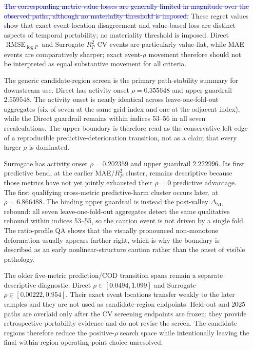 \documentclass[10pt]{article}
\theoremstyle{definition}
\newcommand{\1}{\mathbf{1}}
\newcommand{\oldtext}[1]{\textcolor{blue}{\sout{#1}}}
\newcommand{\latesttext}[1]{\textcolor{latestPurple}{#1}}
\newenvironment{oldrevisionblock}{%
  \begingroup
  \begin{tcolorbox}[
    enhanced,breakable,
    colback=white,colframe=white,boxrule=0pt,
    left=0pt,right=0pt,top=1pt,bottom=1pt,
    coltext=blue,
    overlay unbroken={\draw[blue,line width=.45pt] (frame.south west)--(frame.north east);\draw[blue,line width=.45pt] (frame.north west)--(frame.south east);},
    overlay first={\draw[blue,line width=.45pt] (frame.south west)--(frame.north east);},
    overlay middle={\draw[blue,line width=.45pt] (frame.south west)--(frame.north east);},
    overlay last={\draw[blue,line width=.45pt] (frame.north west)--(frame.south east);}
  ]
}{\end{tcolorbox}\endgroup}
\begin{document}
\begin{oldrevisionblock}
\oldtext{The corresponding metric-value losses are generally limited in magnitude over the observed paths, although no materiality threshold is imposed.}
\latesttext{These regret values show that exact event-location disagreement and value-based loss are distinct aspects of temporal portability; no materiality threshold is imposed. Direct $\operatorname{RMSE}_{\log P}$ and Surrogate $R^2_P$ CV events are particularly value-flat, while MAE events are comparatively sharper; exact event-$\rho$ movement therefore should not be interpreted as equal substantive movement for all criteria.}
\end{oldrevisionblock}

{\color{latestPurple}
The generic candidate-region screen is the primary path-stability summary for downstream use. Direct has activity onset $\rho=0.355648$ and upper guardrail $2.559548$. The activity onset is nearly identical across leave-one-fold-out aggregates (six of seven at the same grid index and one at the adjacent index), while the Direct guardrail remains within indices 53--56 in all seven recalculations. The upper boundary is therefore read as the conservative left edge of a reproducible predictive-deterioration transition, not as a claim that every larger $\rho$ is dominated.

Surrogate has activity onset $\rho=0.202359$ and upper guardrail $2.222996$. Its first predictive bend, at the earlier MAE/$R^2_P$ cluster, remains descriptive because those metrics have not yet jointly exhausted their $\rho=0$ predictive advantage. The first qualifying cross-metric predictive-harm cluster occurs later, at $\rho=6.866488$. The binding upper guardrail is instead the post-valley $\Delta_{\mathrm{NL}}$ rebound: all seven leave-one-fold-out aggregates detect the same qualitative rebound within indices 53--55, so the caution event is not driven by a single fold. The ratio-profile QA shows that the visually pronounced non-monotone deformation usually appears farther right, which is why the boundary is described as an early nonlinear-structure caution rather than the onset of visible pathology.

The older five-metric prediction/COD transition spans remain a separate descriptive diagnostic: Direct $\rho\in[0.0494,1.099]$ and Surrogate $\rho\in[0.00222,0.954]$. Their exact event locations transfer weakly to the later samples and they are not used as candidate-region endpoints. Held-out and 2025 paths are overlaid only after the CV screening endpoints are frozen; they provide retrospective portability evidence and do not revise the screen. The candidate regions therefore reduce the positive-$\rho$ search space while intentionally leaving the final within-region operating-point choice unresolved.
}
\end{document}
